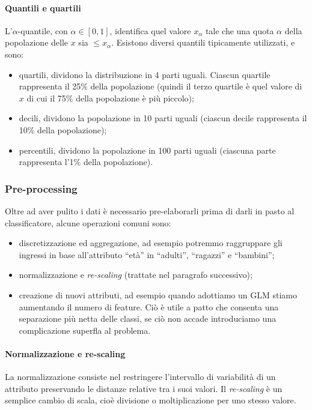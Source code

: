\paragraph{Quantili e quartili}\label{sec:quantili}
L'$\alpha$-quantile, con $\alpha \in [0,1]$, identifica quel valore $x_\alpha$ tale che una quota $\alpha$ della popolazione delle $x$ sia $\leq x_\alpha$.
Esistono diversi quantili tipicamente utilizzati, e sono:
\begin{itemize}
\item quartili, dividono la distribuzione in 4 parti uguali. Ciascun quartile rappresenta il 25\% della popolazione (quindi il terzo quartile è quel valore di $x$ di cui il 75\% della popolazione è più piccolo);
\item decili, dividono la popolazione in 10 parti uguali (ciascun decile rappresenta il 10\% della popolazione);
\item percentili, dividono la popolazione in 100 parti uguali (ciascuna parte rappresenta l'1\% della popolazione).
\end{itemize}

\subsubsection{Pre-processing}
Oltre ad aver pulito i dati è necessario pre-elaborarli prima di darli in pasto al classificatore, alcune operazioni comuni sono:
\begin{itemize}
\item discretizzazione ed aggregazione, ad esempio potremmo raggruppare gli ingressi in base all'attributo ``età'' in ``adulti'', ``ragazzi'' e ``bambini'';
\item normalizzazione e \emph{re-scaling} (trattate nel paragrafo successivo);
\item creazione di nuovi attributi, ad esempio quando adottiamo un GLM stiamo aumentando il numero di feature. Ciò è utile a patto che consenta una separazione più netta delle classi, se ciò non accade introduciamo una complicazione superfla al problema.
\end{itemize}

\paragraph{Normalizzazione e re-scaling}\label{feature_scaling}
La normalizzazione consiste nel restringere l'intervallo di variabilità di un attributo preservando le distanze relative tra i suoi valori. Il \emph{re-scaling} è un semplice cambio di scala, cioè divisione o moltiplicazione per uno stesso valore.

